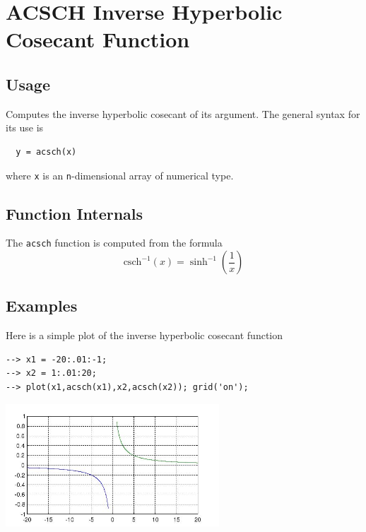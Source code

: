\section{ACSCH Inverse Hyperbolic Cosecant Function}

\subsection{Usage}

Computes the inverse hyperbolic cosecant of its argument.  The general
syntax for its use is
\begin{verbatim}
  y = acsch(x)
\end{verbatim}
where \verb|x| is an \verb|n|-dimensional array of numerical type.
\subsection{Function Internals}

The \verb|acsch| function is computed from the formula
\[
   \mathrm{csch}^{-1}(x) = \sinh^{-1}\left(\frac{1}{x}\right)
\]
\subsection{Examples}

Here is a simple plot of the inverse hyperbolic cosecant function
\begin{verbatim}
--> x1 = -20:.01:-1;
--> x2 = 1:.01:20;
--> plot(x1,acsch(x1),x2,acsch(x2)); grid('on');
\end{verbatim}


\centerline{\includegraphics[width=8cm]{acschplot}}

